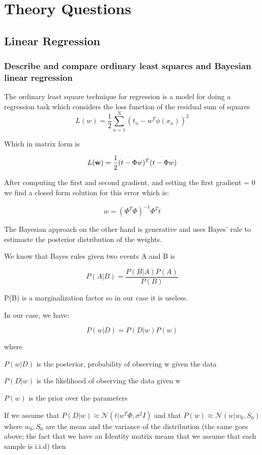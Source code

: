 
\section{Theory Questions}

\subsection{Linear Regression}
\subsubsection{Describe and compare ordinary least squares and Bayesian linear regression}
    The ordinary least square technique for regression is a model for doing a regression task which considers the loss function of the residual sum of squares 
    $$
    L(w) = \frac 1 2 \sum ^N _{n=1} (t_n - w^T \phi(x_n))^2 
    $$

    Which in matrix form is 

    $$
    L(\bold w ) = \frac 1 2 (t-\Phi w)^T (t-\Phi w) 
    $$

    After computing the first and second gradient, and setting the first gradient = 0 we find a closed form solution for this error which is:

    $$
    w = (\Phi^T \Phi) ^{-1} \Phi^T t
    $$

    The Bayesian approach on the other hand is generative and uses Bayes' rule to estimaste the posterior distribution of the weights.

    We know that Bayes rules given two events A and B is 

    $$
    P(A|B) = \frac{P(B|A) P(A)}{P(B)}
    $$

    P(B) is a marginalization factor so in our case it is useless.

    In our case, we have:

    $$
    P(w|D) = P(D|w)P(w)
    $$

    where 

    $P(w|D)$ is the posterior, probability of observing w given the data

    $P(D|w)$ is the likelihood of observing the data given w

    $P(w)$ is the prior over the parameters

    If we assume that $P(D|w) \approx \mathcal{N}  ( t| w^T \Phi, \sigma ^2 I)$ and that $P(w) \approx \mathcal{N} (w | w_0, S_0)$  where $w_0, S_0$ are the mean and the variance of the distribution (the same goes above; the fact that we have an Identity matrix means that we assume that each sample is i.i.d) then


